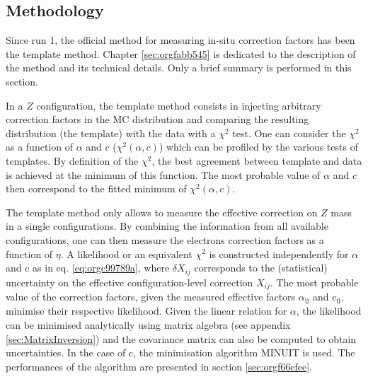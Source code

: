 \subsection{Methodology}
Since run 1, the official method for measuring in-situ correction factors has been the template method.
Chapter \ref{sec:orgfabb545} is dedicated to the description of the method and its technical details.
Only a brief summary is performed in this section.

In a $Z$ configuration, the template method consists in injecting arbitrary correction factors in the MC distribution and comparing the resulting distribution (the template) with the data with a $\chi^2$ test.
One can consider the $\chi^2$ as a function of $\alpha$ and $c$ ($\chi^2(\alpha, c)$) which can be profiled by the various tests of templates.
By definition of the $\chi^2$, the best agreement between template and data is achieved at the minimum of this function.
The most probable value of $\alpha$ and $c$  then correspond to the fitted minimum of $\chi^2(\alpha, c)$.

The template method only allows to measure the effective correction on $Z$ mass in a single configurations.
By combining the information from all available configurations, one can then measure the electrons correction factors as a function of $\eta$.
A likelihood or an equivalent $\chi^2$ is constructed independently for \(\alpha\) and c as in eq. \ref{eq:orgc99789a}, where $\delta X_{ij}$ corresponds to the (statistical) uncertainty on the effective configuration-level correction $X_{ij}$.
The most probable value of the correction factors, given the measured effective factors \(\alpha_{\text{ij}}\) and c\(_{\text{ij}}\), minimise their respective likelihood.
Given the linear relation for \(\alpha\), the likelihood can be minimised analytically using matrix algebra (see appendix \ref{sec:MatrixInversion}) and the covariance matrix can also be computed to obtain uncertainties.
In the case of c, the minimisation algorithm MINUIT \cite{James:873119} is used.
The performances of the algorithm are presented in section \ref{sec:orgf66efee}.

